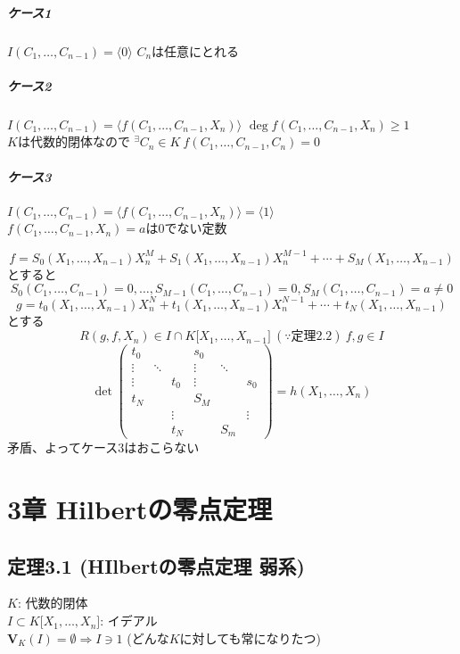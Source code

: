 \documentclass[12pt,a4paper]{article}
\begin{document}
      \subparagraph{ケース1 \\}
        $I(C_1, \ldots, C_{n-1}) = \langle 0 \rangle$ $C_n$は任意にとれる
      \subparagraph{ケース2 \\}
        $I(C_1, \ldots, C_{n-1}) = \langle f(C_1, \ldots, C_{n-1}, X_n) \rangle$
        $\deg f(C_1, \ldots, C_{n-1}, X_n) \geq 1 $ \\
        $K$は代数的閉体なので ${}^\exists C_n \in K \ f(C_1, \ldots, C_{n-1} , C_n) = 0$
      \subparagraph{ケース3 \\}
        $I(C_1, \ldots, C_{n-1}) = \langle f(C_1, \ldots, C_{n-1}, X_n) \rangle = \langle 1 \rangle$ \\
        $f(C_1, \ldots, C_{n-1}, X_n) = a$は$0$でない定数

        \[ f = S_0 (X_1, \ldots, X_{n-1} ) X_n^M + S_1(X_1, \ldots, X_{n-1})X_n^{M-1} + \cdots + S_M (X_1, \ldots, X_{n-1}) \]
        とすると
        \[S_0(C_1, \ldots, C_{n-1}) = 0, \ldots, S_{M-1} (C_1, \ldots, C_{n-1}) = 0, S_M (C_1,\ldots, C_{n-1}) = a \neq 0 \]
        \[g = t_0 (X_1, \ldots, X_{n-1})X_n^N + t_1(X_1, \ldots, X_{n-1})X_n^{N-1} + \cdots + t_N (X_1, \ldots, X_{n-1}) \]
        とする
        \[ R(g, f, X_n) \in I \cap K \lbrack X_1, \ldots, X_{n-1} \rbrack \ (\because \text{定理2.2}) \ f,g\in I\]
        \[ \det \begin{pmatrix}
            t_0 & & & s_0 & & \\
            \vdots & \ddots & & \vdots & \ddots & \\
            \vdots &  & t_0 & \vdots & & s_0 \\
            t_N & & & S_M & & \\
             & & \vdots & & & \vdots \\
              & & t_N & & S_m
          \end{pmatrix}  = h(X_1, \ldots, X_n)  \]
          矛盾、よってケース3はおこらない

\section*{3章 Hilbertの零点定理}
\subsection*{定理3.1 (HIlbertの零点定理 弱系)}
  $K$: 代数的閉体\\
  $I \subset K \lbrack X_1, \ldots, X_n \rbrack$: イデアル \\
  $\mathbf{V}_K (I) = \emptyset \Rightarrow I \ni 1$ (どんな$K$に対しても常になりたつ)
\end{document}

